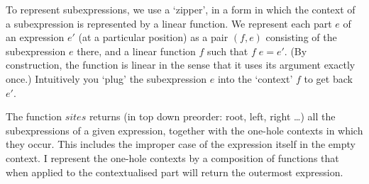 \documentclass{article}
\newcommand{\Varid}[1]{\mathit{#1}}
\begin{document}
To represent subexpressions, we use a `zipper', in a form in which the
context of a subexpression is represented by a linear function.  We
represent each part \ensuremath{\Varid{e}} of an expression \ensuremath{\Varid{e'}} (at a particular
position) as a pair \ensuremath{(\Varid{f},\Varid{e})} consisting of the subexpression \ensuremath{\Varid{e}} there,
and a linear function \ensuremath{\Varid{f}} such that \ensuremath{\Varid{f}\;\Varid{e}\mathrel{=}\Varid{e'}}.  (By construction, the
function is linear in the sense that it uses its argument exactly
once.) Intuitively you `plug' the subexpression \ensuremath{\Varid{e}} into the `context'
\ensuremath{\Varid{f}} to get back \ensuremath{\Varid{e'}}.

The function \ensuremath{\Varid{sites}} returns (in top down preorder: root, left, right \ldots) 
all the subexpressions of a given expression, together with the 
one-hole contexts in which they occur.  This includes the improper case of
the expression itself in the empty context. I represent the one-hole contexts
by a composition of functions that when applied to the contextualised part
will return the outermost expression.
\end{document}
